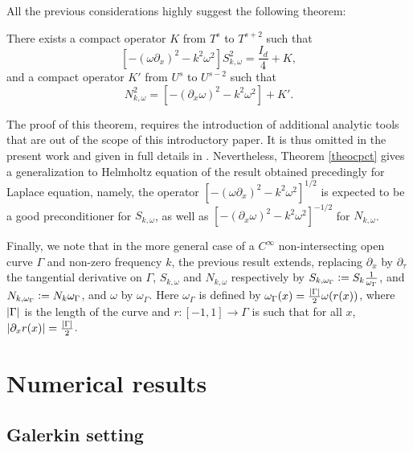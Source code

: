 \documentclass[a4paper]{subfiles}
\begin{document}
All the previous considerations highly suggest the following theorem:	
\begin{theorem} 
\label{theocpct}
	There exists a compact operator $K$ from $T^s$ to $T^{s+2}$ such that
	\[\left[-(\omega \partial_x)^2 - k^2\omega^2\right]S_{k,\omega}^2 = \frac{I_d}{4} + K, \]
	and a compact operator $K'$ from $U^s$ to $U^{s-2}$ such that
	\[N_{k,\omega}^2 = \left[-(\partial_x \omega)^2 - k^2 \omega^2\right] + K'.\]
\end{theorem}
The proof of this theorem, requires the introduction of additional analytic tools that are out of the scope of this introductory paper. 
It is thus omitted in the present work and given in full details in \cite{averseng}. Nevertheless, Theorem \ref{theocpct} gives a generalization
to Helmholtz equation of the result obtained precedingly for Laplace equation, namely, the operator 
$\left[-(\omega \partial_x)^2 - k^2 \omega^2\right]^{1/2}$ is expected to be a good preconditioner for $S_{k,\omega}$, as well as 
$\left[-(\partial_x \omega)^2 - k^2 \omega^2\right]^{-1/2}$ for $N_{k,\omega}$. 

Finally, we note that in the more general case of a $C^{\infty}$ non-intersecting open curve $\Gamma$ and non-zero frequency $k$, the 
previous result extends, replacing $\partial_x$ by $\partial_\tau$ the tangential derivative on $\Gamma$, $S_{k,\omega}$ and $N_{k,\omega}$ respectively by 
$S_{k,\omega_{\Gamma}} \mathrel{\mathop:}= S_k \frac{1}{\omega_\Gamma}$, and $N_{k,\omega_{\Gamma}} \mathrel{\mathop:}= N_k \omega_\Gamma$, and $\omega$ by $\omega_\Gamma$. Here $\omega_\Gamma$ is defined by $\omega_\Gamma(x) = \frac{\left\lvert \Gamma \right\rvert}{2} \omega(r(x))$, where $\left\lvert \Gamma \right\rvert$ is the length of the curve and $r: [-1,1] \to \Gamma$ is such that for all $x$, $\left\lvert \partial_x r(x) \right\rvert = \frac{\left\lvert \Gamma \right\rvert}{2}$.  

\section{Numerical results}
\label{sec:numerMeth}

\subsection{Galerkin setting}
\end{document}
